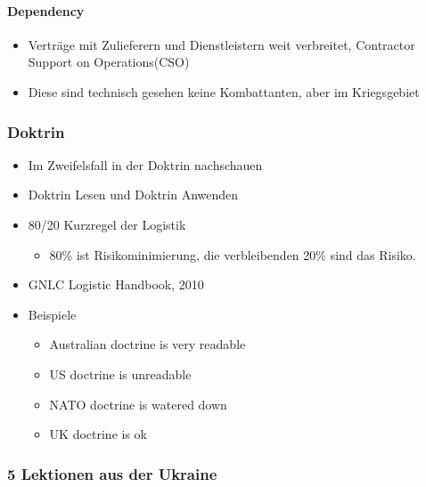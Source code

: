 {}\documentclass[a4paper]{article}
\providecommand{\tightlist}{\setlength{\itemsep}{1mm}\setlength{\parskip}{1mm}}
\begin{document}
\paragraph{Dependency}\label{dependency}

\begin{itemize}
	\tightlist
	\item
	      Verträge mit Zulieferern und Dienstleistern weit verbreitet,
	      Contractor Support on Operations(CSO)
	\item
	      Diese sind technisch gesehen keine Kombattanten, aber im Kriegsgebiet
\end{itemize}

\subsubsection{Doktrin}\label{doktrin}

\begin{itemize}
	\tightlist
	\item
	      Im Zweifelsfall in der Doktrin nachschauen
	\item
	      Doktrin Lesen und Doktrin Anwenden
	\item
	      80/20 Kurzregel der Logistik

	      \begin{itemize}
		      \tightlist
		      \item
		            80\% ist Risikominimierung, die verbleibenden 20\% sind das Risiko.
	      \end{itemize}
	\item
	      GNLC Logistic Handbook, 2010
	\item
	      Beispiele

	      \begin{itemize}
		      \tightlist
		      \item
		            Australian doctrine is very readable
		      \item
		            US doctrine is unreadable
		      \item
		            NATO doctrine is watered down
		      \item
		            UK doctrine is ok
	      \end{itemize}
\end{itemize}

\subsubsection{5 Lektionen aus der
	Ukraine}\label{lektionen-aus-der-ukraine}
\end{document}
